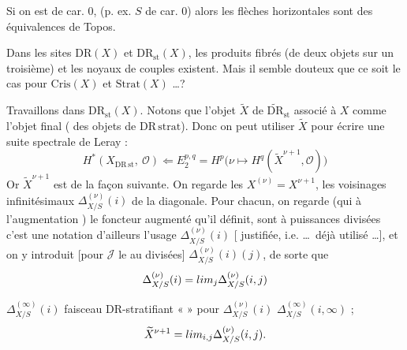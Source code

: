 \documentclass[11pt,a4paper]{article}
\begin{document}
Si  on est de car. 0, (p. ex.
$S$ de car. 0) alors les flèches horizontales sont des équivalences de Topos.

Dans les sites $\mathrm{DR}(X)$ et $\mathrm{DR}_{\mathrm{st}}(X)$, les produits
fibrés (de deux objets sur un troisième) et les noyaux de couples existent.
Mais il semble douteux que ce soit le
cas pour  $\mathrm{Cris}(X)$ et $\mathrm{Strat}(X)$ \ldots ?

Travaillons dans $\mathrm{DR}_{\mathrm{st}}(X)$. Notons que l'objet $\widetilde{X}$
de $\widetilde{\mathrm{DR}}_{\mathrm{st}}$ associé à $X$ comme
l'objet final (\ill{}  des
objets de $\mathrm{DR\,strat}$). Donc on peut utiliser
 $\widetilde{X}$ pour écrire une
suite spectrale de Leray :
\[
  H^{*}(X_{\mathrm{DR\,st}},\ \mathcal{O}) \Longleftarrow
  E_{2}^{p,q} = H^{p}\big(\nu \mapsto H^{q}(\widetilde{X}^{\nu+1}, \mathcal{O})\big)
\]
Or $\widetilde{X}^{\nu+1}$ est  de la façon
suivante. On regarde les $X^{(\nu)} = X^{\nu+1}$, les voisinages
infinitésimaux $\Delta^{(\nu)}_{X/S}(i)$ de la diagonale. Pour chacun, on
regarde (qui à l'augmentation )
le foncteur augmenté 
qu'il définit, sont à puissances divisées
\struck{\ill{}} c'est une notation d'ailleurs  l'usage \ill{}
$\Delta^{(\nu)}_{X/S}(i)$ [\struck{\ill{}} justifiée, i.e. 
\ldots\ déjà utilisé \ldots], et on y introduit
[pour $\mathcal{J}$ le \ill{} au \ill{} divisées] $\Delta^{(\nu)}_{X/S}(i)(j)$,
de sorte que
\[
  \Delta^{(\nu)}_{X/S}(i) = \varinjlim_{j} \Delta^{(\nu)}_{X/S}(i, j)
\]

\ill{} 
$\Delta^{(\infty)}_{X/S}(i)$  faisceau
 $\mathrm{DR}$-stratifiant « \struck{\ill{}} »
pour $\Delta^{(\nu)}_{X/S}(i)$ \ill{} 
$\Delta^{(\infty)}_{X/S}(i, \infty)$ ; \ill{}
\[
  \widetilde{X}^{\nu+1} = \varinjlim_{i, j} \Delta^{(\nu)}_{X/S}(i, j).
\]
\end{document}
